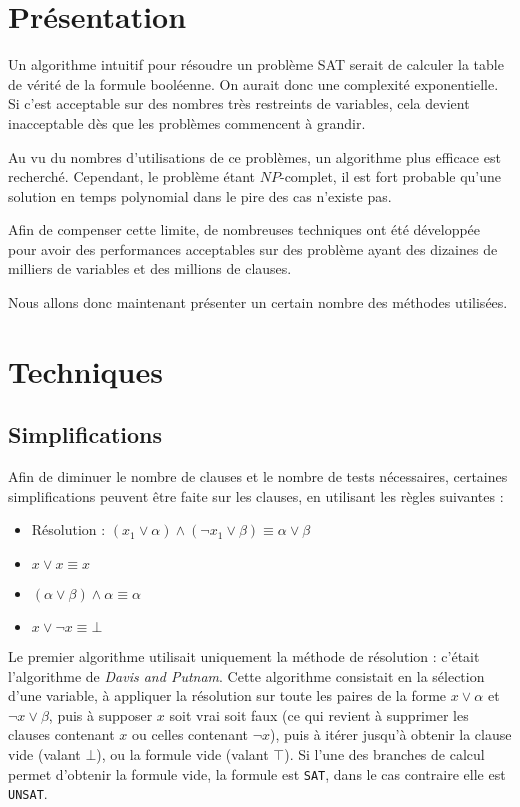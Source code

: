 \section{Présentation}
Un algorithme intuitif pour résoudre un problème SAT serait de calculer la
table de vérité de la formule booléenne. On aurait donc une complexité
exponentielle. Si c'est acceptable sur des nombres très restreints de
variables, cela devient inacceptable dès que les problèmes commencent à
grandir. 

Au vu du nombres d'utilisations de ce problèmes, un algorithme plus efficace
est recherché. Cependant, le problème étant $NP$-complet, il est fort probable
qu'une solution en temps polynomial dans le pire des cas n'existe pas.

Afin de compenser cette limite, de nombreuses techniques ont été développée
pour avoir des performances acceptables  sur des problème ayant des dizaines de milliers de
variables et des millions de clauses.

Nous allons donc maintenant présenter un certain nombre des méthodes utilisées.

\section{Techniques}
\subsection{Simplifications}
Afin de diminuer le nombre de clauses et le nombre de tests nécessaires,
certaines simplifications peuvent être faite sur les clauses, en utilisant les
règles suivantes : \begin{itemize}
    \item Résolution :
           $(x_1\vee\alpha) \wedge (\neg x_1\vee\beta) \equiv \alpha\vee\beta$
    \item $x \vee x \equiv x$
    \item $(\alpha\vee\beta)\wedge\alpha\equiv\alpha$
    \item $x\vee\neg x \equiv \bot$
\end{itemize}

Le premier algorithme utilisait uniquement la méthode de résolution : c'était
l'algorithme de \emph{Davis and Putnam}.  Cette algorithme
consistait en la sélection d'une variable, à appliquer la résolution sur toute
les paires de la forme $x\vee\alpha$ et $\neg x\vee\beta$, puis à supposer
$x$ soit vrai soit faux (ce qui revient à supprimer les clauses contenant $x$
ou celles contenant $\neg x$), puis à itérer jusqu'à obtenir la clause vide
(valant $\bot$), ou la formule vide (valant $\top$). Si l'une des branches de
calcul permet d'obtenir la formule vide, la formule est \texttt{SAT}, dans le
cas contraire elle est \texttt{UNSAT}.

